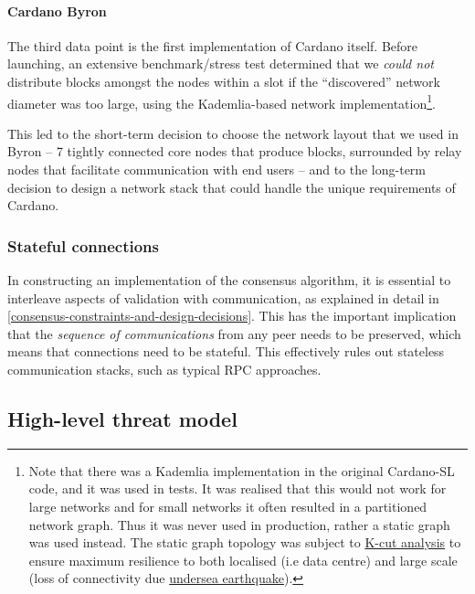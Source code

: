 \documentclass[11pt,a4paper]{article}
\begin{document}
\paragraph{Cardano Byron}

The third data point is the first implementation of Cardano itself.
Before launching, an extensive benchmark/stress test determined that we
\emph{could not} distribute blocks amongst the nodes within a slot if
the ``discovered'' network diameter was too large, using the
Kademlia-based network implementation\footnote{Note that there was a
  Kademlia implementation in the original Cardano-SL code, and it was
  used in tests. It was realised that this would not work for large
  networks and for small networks it often resulted in a partitioned
  network graph. Thus it was never used in production, rather a static
  graph was used instead. The static graph topology was subject to
  \href{https://en.wikipedia.org/wiki/Minimum_k-cut}{{K-cut analysis}}
  to ensure maximum resilience to both localised (i.e data centre) and
  large scale (loss of connectivity due
  \href{https://www.telecomramblings.com/2010/06/subsea-quakes-and-transatlantic-cable-diversity/}{{undersea
  earthquake}}).}.

This led to the short-term decision to choose the network layout that we
used in Byron -- 7 tightly connected core nodes that produce blocks,
surrounded by relay nodes that facilitate communication with end users
-- and to the long-term decision to design a network stack that could
handle the unique requirements of Cardano.

\subsubsection{Stateful connections}
\label{stateful-connections}

In constructing an implementation of the consensus algorithm, it is
essential to interleave aspects of validation with communication, as
explained in detail in
\cref{consensus-constraints-and-design-decisions}. This has the important implication that the \emph{sequence of
communications} from any peer needs to be preserved, which means that
connections need to be stateful. This effectively rules out stateless
communication stacks, such as typical RPC approaches.

\subsection{High-level threat model}
\label{high-level-threat-model}
\end{document}
